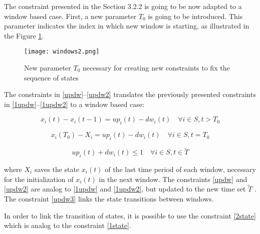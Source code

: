 The constraint presented in the Section 3.2.2 is going to be now adapted to a window based case. First, a new parameter $T_0$ is going to be introduced. This parameter indicates the index in which new window is starting, as illustrated in the Figure \ref{ex_t0}.

\begin{figure}[tb]
    \centering
    \texttt{[image: windows2.png]}
    \caption{New parameter $T_0$ necessary for creating new constraints to fix the sequence of states}
    \label{ex_t0}
\end{figure}


The constraints in \eqref{updw}--\eqref{updw2} translates the previously presented constraints in \eqref{1updw}--\eqref{1updw2} to a window based case:


\begin{equation} \label{updw}
    x_i(t) - x_i(t-1) = up_i(t) - dw_i(t) \quad \forall i \in S, t > T_0
\end{equation}


\begin{equation} \label{updw3}
    x_i(T_0) - X_i = up_i(t) - dw_i(t) \quad \forall i \in S, t = T_0
\end{equation}

\begin{equation} \label{updw2}
    up_i(t) + dw_i(t) \leq 1 \quad \forall i \in S, t \in \tilde{T}
\end{equation}

\noindent where $X_i$ saves the state $x_i(t)$ of the last time period of each window, necessary for the initialization of $x_i(t)$ in the next window. The constraints \eqref{updw} and \eqref{updw2} are analog to \eqref{1updw} and \eqref{1updw2}, but updated to the new time set $\tilde{T}$ . The constraint \eqref{updw3} links the state transitions between windows.


In order to link the transition of states, it is possible to use the constraint \eqref{2state} which is analog to the constraint \eqref{1state}.

